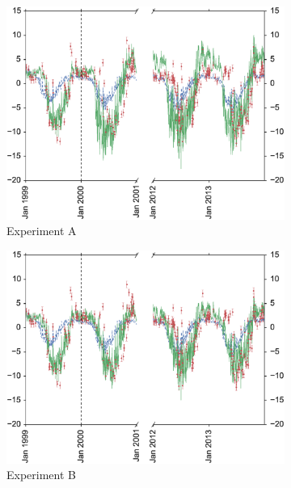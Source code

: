 \documentclass[review]{elsarticle}
\begin{document}
\begin{figure}
    \centering
    \begin{subfigure}[b]{0.49\textwidth}
        \includegraphics[width=\textwidth]{Abroke4dvar.eps}
        \caption{Experiment A}
        \label{fig:broke4dvardiagBR}
    \end{subfigure}
    \begin{subfigure}[b]{0.49\textwidth}
        \includegraphics[width=\textwidth]{Bbroke4dvar.eps}
        \caption{Experiment B}
        \label{fig:broke4dvaredcBR}
    \end{subfigure}
    \begin{subfigure}[b]{0.49\textwidth}

\end{subfigure}
\end{figure}
\end{document}
